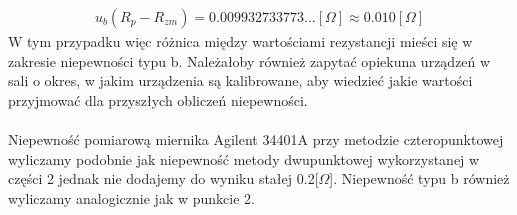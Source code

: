 \documentclass[11pt]{article}
\begin{document}
    \begin{gather*}
        u_b(R_p-R_{zm})=0.009932733773\dots[\Omega]\approx 0.010[\Omega]
    \end{gather*}
    \indent W tym przypadku więc różnica między wartościami rezystancji mieści się w zakresie niepewności typu b.
    Należałoby również zapytać opiekuna urządzeń w sali o okres, w jakim urządzenia są
    kalibrowane, aby wiedzieć jakie wartości przyjmować dla przyszłych obliczeń niepewności.\\\\
    \indent Niepewność pomiarową miernika Agilent 34401A przy
    metodzie czteropunktowej wyliczamy podobnie jak niepewność metody
    dwupunktowej wykorzystanej w części 2 jednak nie dodajemy do wyniku stałej 0.2[$\Omega$].
    Niepewność typu b również wyliczamy analogicznie jak w punkcie 2.
\end{document}
